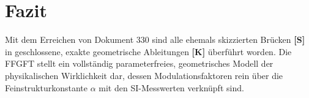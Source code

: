\documentclass[11pt,a4paper]{article}
\begin{document}
	\section{Fazit}
	Mit dem Erreichen von Dokument 330 sind alle ehemals skizzierten Brücken \textbf{[S]} in geschlossene, exakte geometrische Ableitungen \textbf{[K]} überführt worden. Die FFGFT stellt ein vollständig parameterfreies, geometrisches Modell der physikalischen Wirklichkeit dar, dessen Modulationsfaktoren rein über die Feinstrukturkonstante $\alpha$ mit den SI-Messwerten verknüpft sind.
	
\end{document}
